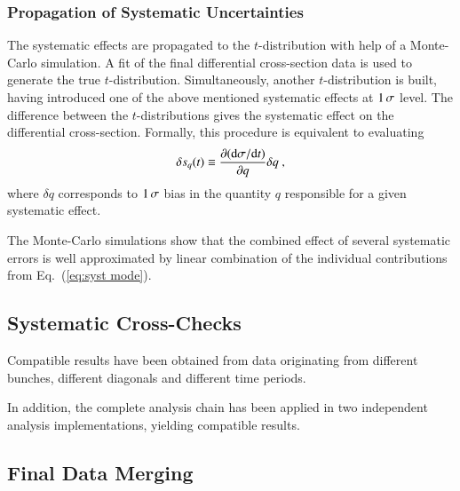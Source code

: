 \subsubsection{Propagation of Systematic Uncertainties}
\label{sec:systematics propagation}

The systematic effects are propagated to the $t$-distribution with help of a Monte-Carlo simulation. A fit of the final differential cross-section data is used to generate the true $t$-distribution. Simultaneously, another $t$-distribution is built, having introduced one of the above mentioned systematic effects at $1\,{\rm \sigma}$ level. The difference between the $t$-distributions gives the systematic effect on the differential cross-section. Formally, this procedure is equivalent to evaluating
\begin{equation}
\label{eq:syst mode}
\delta s_{q}(t) \equiv \frac{\partial({\rm d}\sigma/{\rm d} t)}{\partial q} \delta q\ ,
\end{equation}
where $\delta q$ corresponds to $1\,{\rm \sigma}$ bias in the quantity $q$ responsible for a given systematic effect.

The Monte-Carlo simulations show that the combined effect of several systematic errors is well approximated by linear combination of the individual contributions from Eq.~(\ref{eq:syst mode}).



\subsection{Systematic Cross-Checks}
\label{sec:cross checks}

Compatible results have been obtained from data originating from different bunches, different diagonals and different time periods.

In addition, the complete analysis chain has been applied in two independent analysis implementations, yielding compatible results.


\subsection{Final Data Merging}
\label{sec:final data merging}

